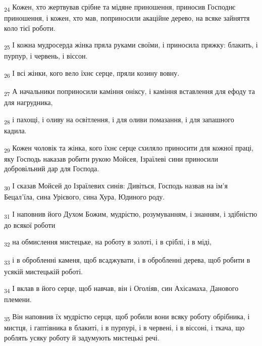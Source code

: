 \begin{tcolorbox}
\textsubscript{24} Кожен, хто жертвував срібне та мідяне приношення, приносив Господнє приношення, і кожен, хто мав, поприносили акаційне дерево, на всяке зайняття коло тієї роботи.
\end{tcolorbox}
\begin{tcolorbox}
\textsubscript{25} І кожна мудросерда жінка пряла руками своїми, і приносила пряжку: блакить, і пурпур, і червень, і віссон.
\end{tcolorbox}
\begin{tcolorbox}
\textsubscript{26} І всі жінки, кого вело їхнє серце, пряли козину вовну.
\end{tcolorbox}
\begin{tcolorbox}
\textsubscript{27} А начальники поприносили каміння оніксу, і каміння вставлення для ефоду та для нагрудника,
\end{tcolorbox}
\begin{tcolorbox}
\textsubscript{28} і пахощі, і оливу на освітлення, і для оливи помазання, і для запашного кадила.
\end{tcolorbox}
\begin{tcolorbox}
\textsubscript{29} Кожен чоловік та жінка, кого їхнє серце схиляло приносити для кожної праці, яку Господь наказав робити рукою Мойсея, Ізраїлеві сини приносили добровільний дар для Господа.
\end{tcolorbox}
\begin{tcolorbox}
\textsubscript{30} І сказав Мойсей до Ізраїлевих синів: Дивіться, Господь назвав на ім'я Бецал'їла, сина Урієвого, сина Хура, Юдиного роду.
\end{tcolorbox}
\begin{tcolorbox}
\textsubscript{31} І наповнив його Духом Божим, мудрістю, розумуванням, і знанням, і здібністю до всякої роботи
\end{tcolorbox}
\begin{tcolorbox}
\textsubscript{32} на обмислення мистецьке, на роботу в золоті, і в сріблі, і в міді,
\end{tcolorbox}
\begin{tcolorbox}
\textsubscript{33} і в обробленні каменя, щоб всаджувати, і в обробленні дерева, щоб робити в усякій мистецькій роботі.
\end{tcolorbox}
\begin{tcolorbox}
\textsubscript{34} І вклав в його серце, щоб навчав, він і Оголіяв, син Ахісамаха, Данового племени.
\end{tcolorbox}
\begin{tcolorbox}
\textsubscript{35} Він наповнив їх мудрістю серця, щоб робили вони всяку роботу обрібника, і мистця, і гаптівника в блакиті, і в пурпурі, і в червені, і в віссоні, і ткача, що роблять усяку роботу й задумують мистецькі речі.
\end{tcolorbox}
